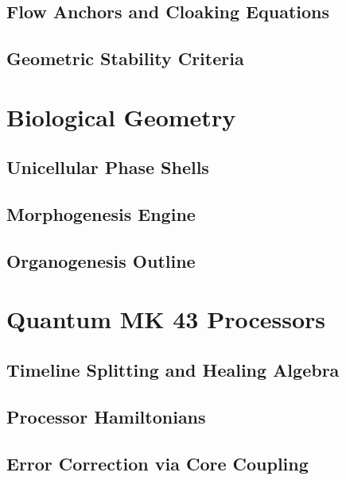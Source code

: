 \subsection{Flow Anchors and Cloaking Equations}

\subsection{Geometric Stability Criteria}

\section{Biological Geometry}
\label{app:bio-geometry}

\subsection{Unicellular Phase Shells}

\subsection{Morphogenesis Engine}

\subsection{Organogenesis Outline}

\section{Quantum MK 43 Processors}
\label{app:qm-processors}

\subsection{Timeline Splitting and Healing Algebra}

\subsection{Processor Hamiltonians}

\subsection{Error Correction via Core Coupling}

